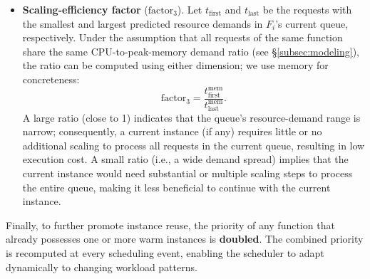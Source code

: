\begin{itemize}
    \item \textbf{Scaling-efficiency factor} ($\text{factor}_3$).  
    Let $t_{\text{first}}$ and $t_{\text{last}}$ be the requests with the smallest 
    and largest predicted resource demands in $F_i$'s current queue, respectively. 
    Under the assumption that all requests of the same function share the same 
    CPU-to-peak-memory demand ratio (see \S\ref{subsec:modeling}), the ratio can be computed 
    using either dimension; we use memory for concreteness:
    \[
    \text{factor}_3 = \frac{t_{\text{first}}^{\text{mem}}}{t_{\text{last}}^{\text{mem}}}.
    \]
    A large ratio (close to 1) indicates that the queue's resource-demand range is narrow; consequently, a current instance (if any) requires little or no additional scaling to process all requests in the current queue, resulting in low execution cost. A small ratio (i.e., a wide demand spread) implies that the current instance would need substantial or multiple scaling steps to process the entire queue, making it less beneficial to continue with the current instance.
\end{itemize}

Finally, to further promote instance reuse, the priority of any function that already possesses one or more warm instances is \textbf{doubled}. The combined priority is recomputed at every scheduling event, enabling the scheduler to adapt dynamically to changing workload patterns.
